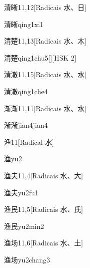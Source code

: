 \begin{entry}{清晰}{11,12}[Radicais ⽔、⽇]
  \begin{phonetics}{清晰}{qing1xi1}
  \end{phonetics}
\end{entry}

\begin{entry}{清楚}{11,13}[Radicais ⽔、⽊]
  \begin{phonetics}{清楚}{qing1chu5}[][HSK 2]
  \end{phonetics}
\end{entry}

\begin{entry}{清澈}{11,15}[Radicais ⽔、⽔]
  \begin{phonetics}{清澈}{qing1che4}
  \end{phonetics}
\end{entry}

\begin{entry}{渐渐}{11,11}[Radicais ⽔、⽔]
  \begin{phonetics}{渐渐}{jian4jian4}
  \end{phonetics}
\end{entry}

\begin{entry}{渔}{11}[Radical ⽔]
  \begin{phonetics}{渔}{yu2}
  \end{phonetics}
\end{entry}

\begin{entry}{渔夫}{11,4}[Radicais ⽔、⼤]
  \begin{phonetics}{渔夫}{yu2fu1}
  \end{phonetics}
\end{entry}

\begin{entry}{渔民}{11,5}[Radicais ⽔、⽒]
  \begin{phonetics}{渔民}{yu2min2}
  \end{phonetics}
\end{entry}

\begin{entry}{渔场}{11,6}[Radicais ⽔、⼟]
  \begin{phonetics}{渔场}{yu2chang3}
  \end{phonetics}
\end{entry}

